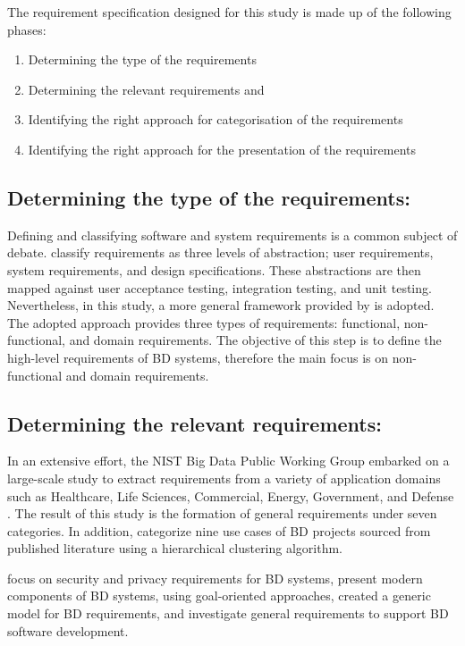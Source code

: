 \documentclass[journal]{IEEEtran}
\begin{document}
The requirement specification designed for this study is made up of the following phases: 

\begin{enumerate}
    \item Determining the type of the requirements 
    \item Determining the relevant requirements and 
    \item Identifying the right approach for categorisation of the requirements 
    \item Identifying the right approach for the presentation of the requirements 
\end{enumerate}

\subsection{Determining the type of the requirements:}

Defining and classifying software and system requirements is a common subject of debate. \cite{sommerville2011software}\cite{sommerville2011software} classify requirements as three levels of abstraction; user requirements, system requirements, and design specifications. These abstractions are then mapped against user acceptance testing, integration testing, and unit testing. Nevertheless, in this study, a more general framework provided by \cite{laplante2017requirements} is adopted. The adopted approach provides three types of requirements: functional, non-functional, and domain requirements. The objective of this step is to define the high-level requirements of BD systems, therefore the main focus is on non-functional and domain requirements. 

\subsection{Determining the relevant requirements:}

In an extensive effort, the NIST Big Data Public Working Group embarked on a large-scale study to extract requirements from a variety of application domains such as Healthcare, Life Sciences, Commercial, Energy, Government, and Defense \cite{Chang}. The result of this study is the formation of general requirements under seven categories. In addition, \cite{volk2020identifying} categorize nine use cases of BD projects sourced from published literature using a hierarchical clustering algorithm. 

\cite{AtaeiSecurity}\cite{AtaeiSecurity} focus on security and privacy requirements for BD systems, \cite{yu2019components} present modern components of BD systems, using goal-oriented approaches, \cite{eridaputra2014modeling} created a generic model for BD requirements, and  \cite{al2016characteristics} investigate general requirements to support BD software development. 
\end{document}
